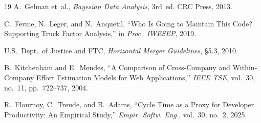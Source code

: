 \documentclass[conference]{IEEEtran}
\begin{document}
\begin{thebibliography}{19}
  A.~Gelman et~al.,
  \textit{Bayesian Data Analysis}, 3rd~ed.
  CRC Press, 2013.

  C.~Ferme, N.~Leger, and N.~Anquetil,
  ``Who Is Going to Maintain This Code? Supporting Truck Factor Analysis,''
  in \textit{Proc.\ IWESEP}, 2019.

  U.S.~Dept.\ of Justice and FTC,
  \textit{Horizontal Merger Guidelines}, \S5.3, 2010.

  B.~Kitchenham and E.~Mendes,
  ``A Comparison of Cross-Company and Within-Company Effort Estimation
  Models for Web Applications,''
  \textit{IEEE TSE}, vol.~30, no.~11, pp.~722--737, 2004.

  R.~Flournoy, C.~Treude, and B.~Adams,
  ``Cycle Time as a Proxy for Developer Productivity: An Empirical Study,''
  \textit{Empir. Softw. Eng.}, vol.~30, no.~2, 2025.

\end{thebibliography}
\end{document}
